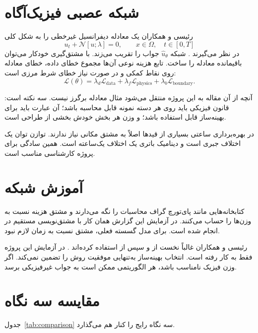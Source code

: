 \section{شبکه عصبی فیزیک‌آگاه}
رئیسی و همکاران یک معادله دیفرانسیل غیرخطی را به شکل کلی
\begin{equation}
  u_t+\mathcal{N}[u;\lambda]=0,
  \qquad x\in\Omega,\quad t\in[0,T]
  \label{eq:general-pde}
\end{equation}
در نظر می‌گیرند . شبکه $\hat{u}_{\theta}$ جواب را تقریب می‌زند. با مشتق‌گیری خودکار می‌توان باقیمانده معادله را ساخت. تابع هزینه نوعی آن‌ها مجموع خطای داده، خطای معادله روی نقاط کمکی و در صورت نیاز خطای شرط مرزی است:
\begin{equation}
  \mathcal{L}(\theta)
  =\lambda_{d}\mathcal{L}_{\mathrm{data}}
  +\lambda_{f}\mathcal{L}_{\mathrm{physics}}
  +\lambda_{b}\mathcal{L}_{\mathrm{boundary}}.
  \label{eq:pinn-loss}
\end{equation}

آنچه از آن مقاله به این پروژه منتقل می‌شود مثال معادله برگرز نیست. سه نکته است: قانون فیزیکی باید روی هر دسته نمونه قابل محاسبه باشد؛ آن عبارت باید برای بهینه‌ساز قابل استفاده باشد؛ و وزن هر بخش خودش بخشی از طراحی است.

در بهره‌برداری ساعتی بسیاری از قیدها اصلاً به مشتق مکانی نیاز ندارند. توازن توان یک اختلاف جبری است و دینامیک باتری یک اختلاف یک‌ساعته است. همین سادگی برای پروژه کارشناسی مناسب است.

\section{آموزش شبکه}
کتابخانه‌هایی مانند پای‌تورچ گراف محاسبات را نگه می‌دارند و مشتق هزینه نسبت به وزن‌ها را حساب می‌کنند. در آزمایش این گزارش همان کار با مشتق‌نویسی مستقیم در  انجام شده است. برای مدل گسسته فعلی، مشتق نسبت به زمان لازم نبود.

رئیسی و همکاران غالباً نخست از  و سپس از  استفاده کرده‌اند . در آزمایش این پروژه فقط  به کار رفته است. انتخاب بهینه‌ساز به‌تنهایی موفقیت روش را تضمین نمی‌کند. اگر وزن فیزیک نامناسب باشد، هر الگوریتمی ممکن است به جواب غیرفیزیکی برسد.

\section{مقایسه سه نگاه}
جدول~\ref{tab:comparison} سه نگاه رایج را کنار هم می‌گذارد.


